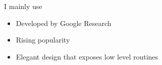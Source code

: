\begin{frame}

    I mainly use

            \vspace{0.5em}

    \begin{figure}
       \centering
    \end{figure}
    
            \vspace{0.5em}

    \begin{itemize}
        \item Developed by Google Research
            \vspace{0.5em}
        \item Rising popularity
            \vspace{0.5em}
        \item Elegant design that exposes low level routines
    \end{itemize}

\end{frame}


